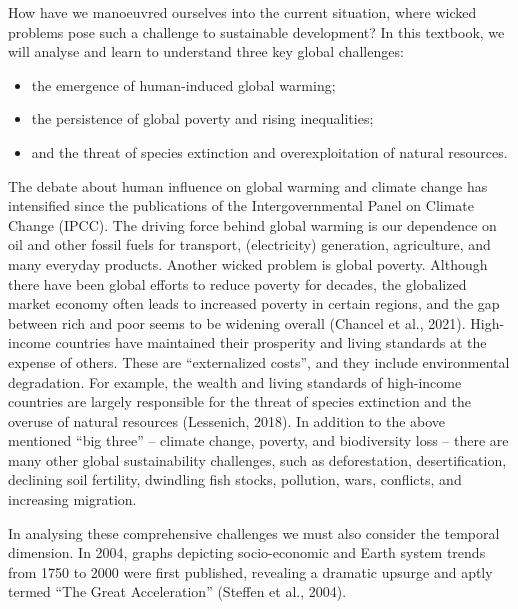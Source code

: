\documentclass[
  a4paper,
  openany]{book}
\begin{document}
How have we manoeuvred ourselves into the current situation, where
wicked problems pose such a challenge to sustainable development? In
this textbook, we will analyse and learn to understand three key global
challenges:

\begin{itemize}
\item
  the emergence of human-induced global warming;
\item
  the persistence of global poverty and rising inequalities;
\item
  and the threat of species extinction and overexploitation of natural
  resources.
\end{itemize}

The debate about human influence on global warming and climate change
has intensified since the publications of the Intergovernmental Panel on
Climate Change (IPCC). The driving force behind global warming is our
dependence on oil and other fossil fuels for transport, (electricity)
generation, agriculture, and many everyday products. Another wicked
problem is global poverty. Although there have been global efforts to
reduce poverty for decades, the globalized market economy often leads to
increased poverty in certain regions, and the gap between rich and poor
seems to be widening overall (Chancel et al., 2021). High-income
countries have maintained their prosperity and living standards at the
expense of others. These are ``externalized costs'', and they include
environmental degradation. For example, the wealth and living standards
of high-income countries are largely responsible for the threat of
species extinction and the overuse of natural resources (Lessenich,
2018). In addition to the above mentioned ``big three'' -- climate
change, poverty, and biodiversity loss -- there are many other global
sustainability challenges, such as deforestation, desertification,
declining soil fertility, dwindling fish stocks, pollution, wars,
conflicts, and increasing migration.

In analysing these comprehensive challenges we must also consider the
temporal dimension. In 2004, graphs depicting socio-economic and Earth
system trends from 1750 to 2000 were first published, revealing a
dramatic upsurge and aptly termed ``The Great Acceleration'' (Steffen et
al., 2004).
\end{document}
